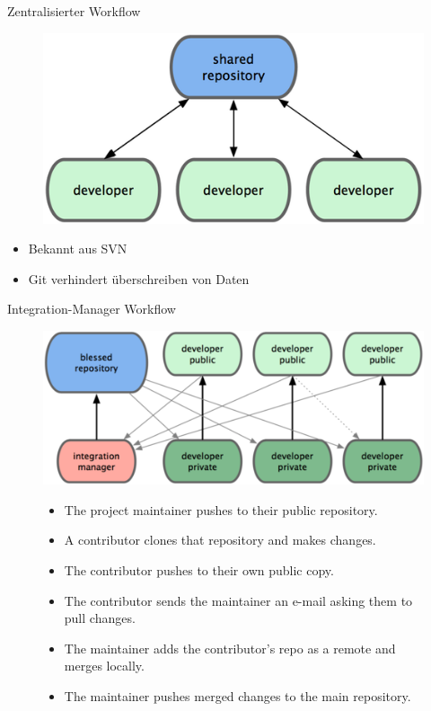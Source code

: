 \documentclass{beamer}
\begin{document}
\begin{frame}{Zentralisierter Workflow}
\begin{figure} 
\centering
\includegraphics{images/centralized-workflow.png}
\end{figure}
\begin{itemize}
\pause \item Bekannt aus SVN
\pause \item Git verhindert überschreiben von Daten
\end{itemize}
\end{frame}

\begin{frame}{Integration-Manager Workflow}
\begin{figure} 
\centering
\includegraphics{images/integration-manager-workflow.png}
\begin{itemize}
\pause \item The project maintainer pushes to their public repository.
\pause \item A contributor clones that repository and makes changes.
\pause \item The contributor pushes to their own public copy.
\pause \item The contributor sends the maintainer an e-mail asking them to pull changes.
\pause \item The maintainer adds the contributor’s repo as a remote and merges locally.
\pause \item The maintainer pushes merged changes to the main repository.
\end{itemize}
\end{figure}
\end{frame}
\end{document}
